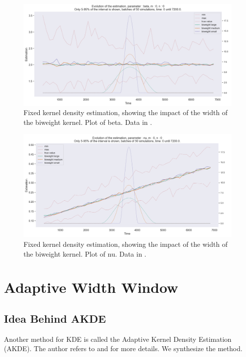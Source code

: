 \begin{figure}
\centering
\includegraphics[width = 0.90 \textwidth]{../imag/chap3/compar_kernel/3beta.png}
\caption{Fixed kernel density estimation, showing the impact of the width of the biweight kernel. Plot of beta. Data in \protect {}.}
\label{fig:basic_3_kernels_beta}
\end{figure}

\begin{figure}
\centering
\includegraphics[width = 0.90 \textwidth]{../imag/chap3/compar_kernel/3nu.png}
\caption{Fixed kernel density estimation, showing the impact of the width of the biweight kernel. Plot of nu. Data in \protect {}.}
\label{fig:basic_3_kernels_nu}
\end{figure}




\section{Adaptive Width Window}
\subsection{Idea Behind AKDE}
Another method for KDE is called the Adaptive Kernel Density Estimation (AKDE). The author refers to \cite{Methods_ESTIM} and \cite{AKDE_ex} for more details. We synthesize the method.


